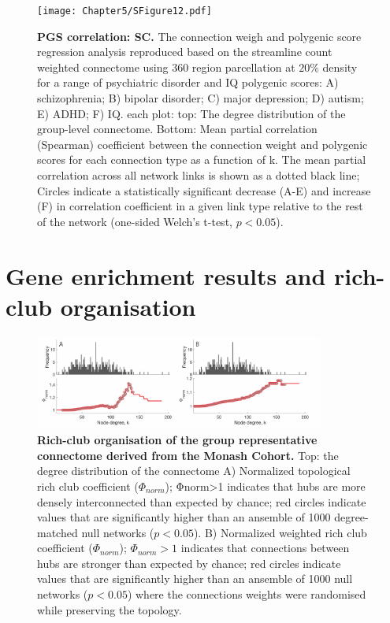\begin{figure}[h!]
\begin{center}
\texttt{[image: Chapter5/SFigure12.pdf]}%
\end{center}
\caption{\textbf{PGS correlation: SC.} 
The connection weigh and polygenic score regression analysis reproduced based on the streamline count weighted connectome using 360 region parcellation at $20\%$ density for a range of psychiatric disorder and IQ polygenic scores: A) schizophrenia; B) bipolar disorder; C) major depression; D) autism; E) ADHD; F) IQ. each plot: top: The degree distribution of the group-level connectome. Bottom: Mean partial correlation (Spearman) coefficient between the connection weight and polygenic scores for each connection type as a function of k. The mean partial correlation across all network links is shown as a dotted black line; Circles indicate a statistically significant decrease (A-E) and increase (F) in correlation coefficient in a given link type relative to the rest of the network (one-sided Welch's t-test, $p < 0.05$). }
\label{fig:Ch5SFig12}
\end{figure}

\clearpage
\section{Gene enrichment results and rich-club organisation}
\label{app:AppendixCh5_3}

\begin{figure}[h!]
\begin{center}
\includegraphics[width=0.85\textwidth]{Chapter5/SFigure13.pdf}%
\end{center}
\caption{\textbf{Rich-club organisation of the group representative connectome derived from the Monash Cohort.} Top: the degree distribution of the connectome A) Normalized topological rich club coefficient ($\Phi_{norm}$); Φnorm>1 indicates that hubs are more densely interconnected than expected by chance; red circles indicate values that are significantly higher than an ansemble of 1000 degree-matched null networks ($p<0.05$). B) Normalized weighted rich club coefficient ($\Phi_{norm}$); $\Phi_{norm}>1$ indicates that connections between hubs are stronger than expected by chance; red circles indicate values that are significantly higher than an ansemble of 1000 null networks ($p<0.05$) where the connections weights were randomised while preserving the topology. }
\label{fig:Ch5SFig13}
\end{figure}

